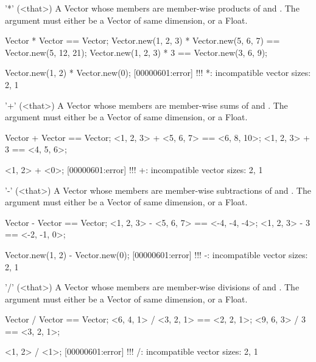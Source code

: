 \begin{urbiscriptapi}
\item['*'](<that>)%
  A Vector whose members are member-wise products of \this and \that.  The
  argument \that must either be a Vector of same dimension, or a Float.
\begin{urbiassert}
Vector              * Vector              == Vector;
Vector.new(1, 2, 3) * Vector.new(5, 6, 7) == Vector.new(5, 12, 21);
Vector.new(1, 2, 3) * 3                   == Vector.new(3,  6,  9);

Vector.new(1, 2) * Vector.new(0);
[00000601:error] !!! *: incompatible vector sizes: 2, 1
\end{urbiassert}


\item['+'](<that>)%
  A Vector whose members are member-wise sums of \this and \that.  The
  argument \that must either be a Vector of same dimension, or a Float.
\begin{urbiassert}
Vector              + Vector              == Vector;
<1, 2, 3> + <5, 6, 7> == <6, 8, 10>;
<1, 2, 3> + 3                   == <4, 5,  6>;

<1, 2> + <0>;
[00000601:error] !!! +: incompatible vector sizes: 2, 1
\end{urbiassert}


\item['-'](<that>)%
  A Vector whose members are member-wise subtractions of \this and \that.
  The argument \that must either be a Vector of same dimension, or a Float.
\begin{urbiassert}
Vector              - Vector              == Vector;
<1, 2, 3> - <5, 6, 7> == <-4, -4, -4>;
<1, 2, 3> - 3                   == <-2, -1,  0>;

Vector.new(1, 2) - Vector.new(0);
[00000601:error] !!! -: incompatible vector sizes: 2, 1
\end{urbiassert}


\item['/'](<that>)%
  A Vector whose members are member-wise divisions of \this and \that.  The
  argument \that must either be a Vector of same dimension, or a Float.
\begin{urbiassert}
Vector              / Vector              == Vector;
<6, 4, 1> / <3, 2, 1> == <2, 2, 1>;
<9, 6, 3> / 3                   == <3, 2, 1>;

<1, 2> / <1>;
[00000601:error] !!! /: incompatible vector sizes: 2, 1
\end{urbiassert}



\end{urbiscriptapi}
